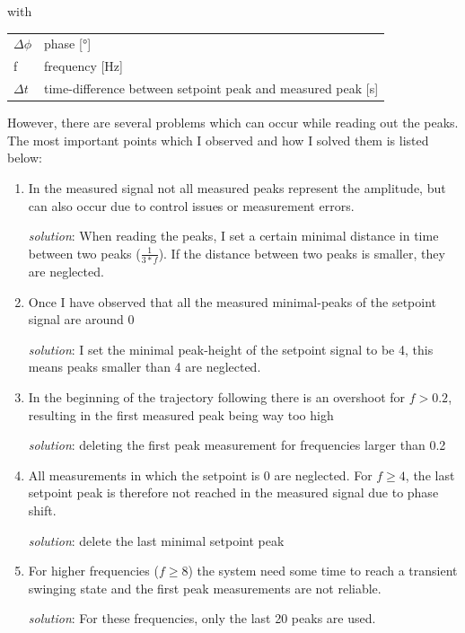 with
\begin{tabular}{l l}
    $\Delta\phi$ & phase [°]\\
    f & frequency [Hz]\\
    $\Delta t$ & time-difference between setpoint peak and measured peak [s]
\end{tabular}
\vspace{4mm}

However, there are several problems which can occur while reading out the peaks. The most important points which I observed and how I solved them is listed below:

\begin{enumerate}
    \item In the measured signal not all measured peaks represent the amplitude, but can also occur due to control issues or measurement errors.
    
    \emph{solution}: When reading the peaks, I set a certain minimal distance in time between two peaks ($\frac{1}{3*f}$). If the distance between two peaks is smaller, they are neglected.
    
    \item Once I have observed that all the measured minimal-peaks of the setpoint signal are around 0
    
    \emph{solution}: I set the minimal peak-height of the setpoint signal to be 4, this means peaks smaller than 4 are neglected.
    
    \item In the beginning of the trajectory following there is an overshoot for $f>0.2$, resulting in the first measured peak being way too high
    
    \emph{solution}: deleting the first peak measurement for frequencies larger than 0.2
    
    \item All measurements in which the setpoint is 0 are neglected. For $f\geq4$, the last setpoint peak is therefore not reached in the measured signal due to phase shift.
    
    \emph{solution}: delete the last minimal setpoint peak
    
    \item For higher frequencies ($f\geq8$) the system need some time to reach a transient swinging state and the first peak measurements are not reliable.
    
    \emph{solution}: For these frequencies, only the last 20 peaks are used.
    

\end{enumerate}

